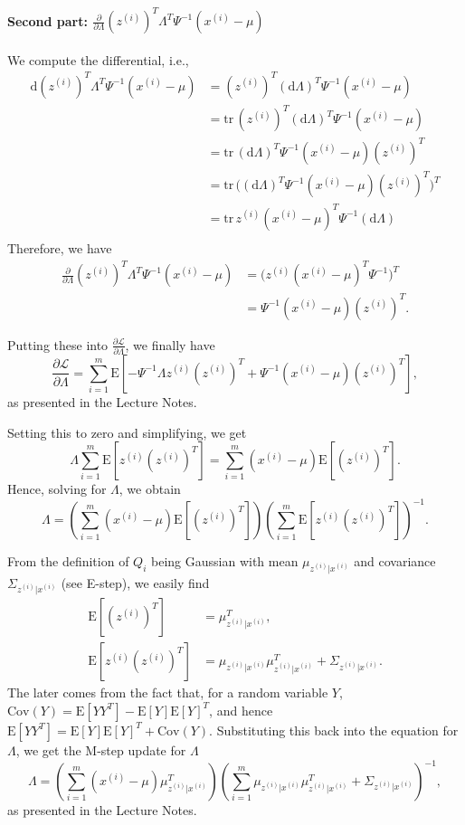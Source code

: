 \documentclass{article}
\begin{document}
\paragraph{Second part: $\frac{\partial }{\partial\Lambda}(z^{(i)})^T\Lambda^T\Psi^{-1}(x^{(i)}-\mu)$} We compute the differential, i.e.,
\[
\begin{split}
\text{d}(z^{(i)})^T\Lambda^T\Psi^{-1}(x^{(i)}-\mu)
&=(z^{(i)})^T(\text{d}\Lambda)^T\Psi^{-1}(x^{(i)}-\mu)\\
&=\text{tr}\,(z^{(i)})^T(\text{d}\Lambda)^T\Psi^{-1}(x^{(i)}-\mu)\\
&=\text{tr}\,(\text{d}\Lambda)^T\Psi^{-1}(x^{(i)}-\mu)(z^{(i)})^T\\
&=\text{tr}\,\big((\text{d}\Lambda)^T\Psi^{-1}(x^{(i)}-\mu)(z^{(i)})^T\big)^T\\
&=\text{tr}\,z^{(i)}(x^{(i)}-\mu)^T\Psi^{-1}(\text{d}\Lambda)\\
\end{split}
\]
Therefore, we have
\[
\begin{split}
\frac{\partial }{\partial\Lambda}(z^{(i)})^T\Lambda^T\Psi^{-1}(x^{(i)}-\mu)
&=\big(z^{(i)}(x^{(i)}-\mu)^T\Psi^{-1}\big)^T\\
&=\Psi^{-1}(x^{(i)}-\mu)(z^{(i)})^T.
\end{split}
\]

Putting these into $\frac{\partial \mathcal{L}}{\partial\Lambda}$, we finally have
\[
\frac{\partial \mathcal{L}}{\partial\Lambda}
=\sum_{i=1}^m \text{E}\left[-\Psi^{-1}\Lambda z^{(i)}(z^{(i)})^T
+\Psi^{-1}(x^{(i)}-\mu)(z^{(i)})^T\right],
\]
as presented in the Lecture Notes.

Setting this to zero and simplifying, we get
\[
\Lambda \sum_{i=1}^m \text{E}\left[z^{(i)}(z^{(i)})^T\right]= \sum_{i=1}^m(x^{(i)}-\mu)\text{E}\left[(z^{(i)})^T\right].
\]
Hence, solving for $\Lambda$, we obtain
\[
\Lambda=\left(\sum_{i=1}^m(x^{(i)}-\mu)\text{E}\left[(z^{(i)})^T\right]\right)
\left(\sum_{i=1}^m \text{E}\left[z^{(i)}(z^{(i)})^T\right]\right)^{-1}.
\]

From the definition of $Q_i$ being Gaussian with mean $\mu_{z^{(i)}|x^{(i)}}$ and covariance $\Sigma_{z^{(i)}|x^{(i)}}$ (see E-step), we easily find
\[
\begin{split}
\text{E}\left[(z^{(i)})^T\right]&=\mu_{z^{(i)}|x^{(i)}}^T,\\
\text{E}\left[z^{(i)}(z^{(i)})^T\right]&=\mu_{z^{(i)}|x^{(i)}}\mu_{z^{(i)}|x^{(i)}}^T+\Sigma_{z^{(i)}|x^{(i)}}.
\end{split}
\]
The later comes from the fact that, for a random variable $Y$, $\text{Cov}(Y)=\text{E}[YY^T]-\text{E}[Y]\text{E}[Y]^T$, and hence $\text{E}[YY^T]=\text{E}[Y]\text{E}[Y]^T+\text{Cov}(Y)$. Substituting this back into the equation for $\Lambda$, we get the M-step update for $\Lambda$
\[
\Lambda=\left(\sum_{i=1}^m(x^{(i)}-\mu)\mu_{z^{(i)}|x^{(i)}}^T\right)
\left(\sum_{i=1}^m \mu_{z^{(i)}|x^{(i)}}\mu_{z^{(i)}|x^{(i)}}^T+\Sigma_{z^{(i)}|x^{(i)}}\right)^{-1},
\]
as presented in the Lecture Notes.
\end{document}
